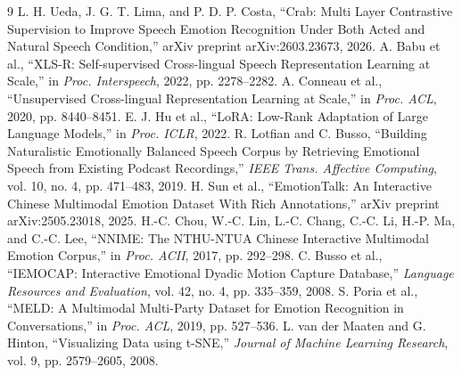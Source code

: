 \begingroup
\let\chapter\section
\renewcommand{\bibname}{本章參考文獻}
\begin{thebibliography}{9}
\setlength{\itemsep}{0.1em}
\small
{} L. H. Ueda, J. G. T. Lima, and P. D. P. Costa,
``Crab: Multi Layer Contrastive Supervision to Improve Speech Emotion Recognition Under Both Acted and Natural Speech Condition,''
arXiv preprint arXiv:2603.23673, 2026.
 A. Babu et al.,
``XLS-R: Self-supervised Cross-lingual Speech Representation Learning at Scale,''
in \textit{Proc. Interspeech}, 2022, pp. 2278--2282.
 A. Conneau et al.,
``Unsupervised Cross-lingual Representation Learning at Scale,''
in \textit{Proc. ACL}, 2020, pp. 8440--8451.
 E. J. Hu et al.,
``LoRA: Low-Rank Adaptation of Large Language Models,''
in \textit{Proc. ICLR}, 2022.
 R. Lotfian and C. Busso,
``Building Naturalistic Emotionally Balanced Speech Corpus by Retrieving Emotional Speech from Existing Podcast Recordings,''
\textit{IEEE Trans. Affective Computing}, vol. 10, no. 4, pp. 471--483, 2019.
 H. Sun et al.,
``EmotionTalk: An Interactive Chinese Multimodal Emotion Dataset With Rich Annotations,''
arXiv preprint arXiv:2505.23018, 2025.
 H.-C. Chou, W.-C. Lin, L.-C. Chang, C.-C. Li, H.-P. Ma, and C.-C. Lee,
``NNIME: The NTHU-NTUA Chinese Interactive Multimodal Emotion Corpus,''
in \textit{Proc. ACII}, 2017, pp. 292--298.
 C. Busso et al.,
``IEMOCAP: Interactive Emotional Dyadic Motion Capture Database,''
\textit{Language Resources and Evaluation}, vol. 42, no. 4, pp. 335--359, 2008.
 S. Poria et al.,
``MELD: A Multimodal Multi-Party Dataset for Emotion Recognition in Conversations,''
in \textit{Proc. ACL}, 2019, pp. 527--536.
 L. van der Maaten and G. Hinton,
``Visualizing Data using t-SNE,''
\textit{Journal of Machine Learning Research}, vol. 9, pp. 2579--2605, 2008.
\end{thebibliography}
\endgroup
